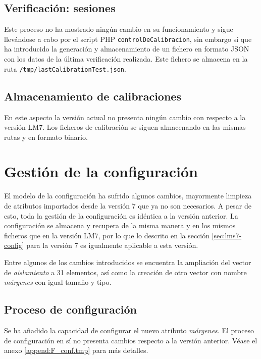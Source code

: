 \subsection{Verificación: sesiones}

Este proceso no ha mostrado ningún cambio en su funcionamiento y sigue llevándose a cabo por el script PHP \verb|controlDeCalibracion|, sin embargo sí que ha introducido la generación y almacenamiento de un fichero en formato \acrshort{JSON} con los datos de la última verificación realizada. Este fichero se almacena en la ruta \verb|/tmp/lastCalibrationTest.json|.

\subsection{Almacenamiento de calibraciones}

En este aspecto la versión actual no presenta ningún cambio con respecto a la versión \acrshort{LM7}. Los ficheros de calibración se siguen almacenando en las mismas rutas y en formato binario.

\section{Gestión de la configuración}

El modelo de la configuración ha sufrido algunos cambios, mayormente limpieza de atributos importados desde la versión 7 que ya no son necesarios. A pesar de esto, toda la gestión de la configuración es idéntica a la versión anterior. La configuración se almacena y recupera de la misma manera y en los mismos ficheros que en la versión \acrshort{LM7}, por lo que lo descrito en la sección \ref{sec:lms7-config} para la versión 7 es igualmente aplicable a esta versión.

Entre algunos de los cambios introducidos se encuentra la ampliación del vector de \textit{aislamiento} a 31 elementos, así como la creación de otro vector con nombre \textit{márgenes} con igual tamaño y tipo.

\subsection{Proceso de configuración}

Se ha añadido la capacidad de configurar el nuevo atributo \textit{márgenes}. El proceso de configuración en sí no presenta cambios respecto a la versión anterior. Véase el anexo \ref{append:F_conf.tmp} para más detalles.

